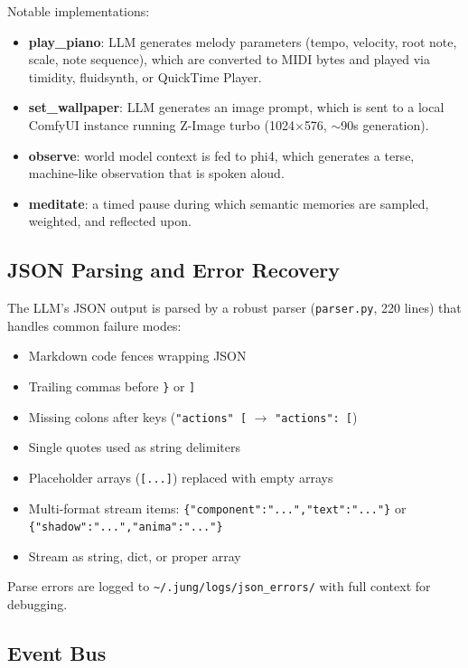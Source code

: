 \documentclass[11pt,oneside]{article}
\begin{document}
Notable implementations:

\begin{itemize}
  \item \textbf{play\_piano}: LLM generates melody parameters (tempo, velocity, root note, scale, note sequence), which are converted to MIDI bytes and played via timidity, fluidsynth, or QuickTime Player.
  \item \textbf{set\_wallpaper}: LLM generates an image prompt, which is sent to a local ComfyUI instance running Z-Image turbo (1024$\times$576, $\sim$90s generation).
  \item \textbf{observe}: world model context is fed to phi4, which generates a terse, machine-like observation that is spoken aloud.
  \item \textbf{meditate}: a timed pause during which semantic memories are sampled, weighted, and reflected upon.
\end{itemize}

\subsection{JSON Parsing and Error Recovery}

The LLM's JSON output is parsed by a robust parser (\texttt{parser.py}, 220 lines) that handles common failure modes:

\begin{itemize}
  \item Markdown code fences wrapping JSON
  \item Trailing commas before \texttt{\}} or \texttt{]}
  \item Missing colons after keys (\texttt{"actions" [} $\to$ \texttt{"actions": [})
  \item Single quotes used as string delimiters
  \item Placeholder arrays (\texttt{[...]}) replaced with empty arrays
  \item Multi-format stream items: \texttt{\{"component":"...","text":"..."\}} or \texttt{\{"shadow":"...","anima":"..."\}}
  \item Stream as string, dict, or proper array
\end{itemize}

Parse errors are logged to \texttt{\~{}/.jung/logs/json\_errors/} with full context for debugging.

\subsection{Event Bus}
\end{document}
